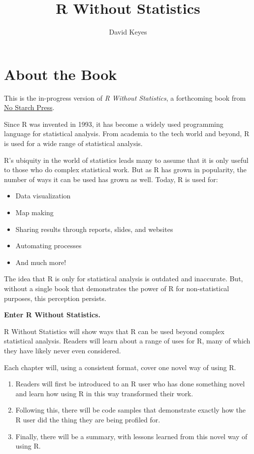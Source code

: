 \documentclass[
]{book}
\title{R Without Statistics}
\author{David Keyes}
\date{}
\begin{document}
\maketitle

{
\setcounter{tocdepth}{1}
\tableofcontents
}
\hypertarget{about-the-book}{%
\chapter{About the Book}\label{about-the-book}}

This is the in-progress version of \emph{R Without Statistics}, a forthcoming book from \href{https://www.nostarch.com/}{No Starch Press}.

Since R was invented in 1993, it has become a widely used programming language for statistical analysis. From academia to the tech world and beyond, R is used for a wide range of statistical analysis.

R's ubiquity in the world of statistics leads many to assume that it is only useful to those who do complex statistical work. But as R has grown in popularity, the number of ways it can be used has grown as well. Today, R is used for:

\begin{itemize}
\item
  Data visualization
\item
  Map making
\item
  Sharing results through reports, slides, and websites
\item
  Automating processes
\item
  And much more!
\end{itemize}

The idea that R is only for statistical analysis is outdated and inaccurate. But, without a single book that demonstrates the power of R for non-statistical purposes, this perception persists.

\textbf{Enter R Without Statistics.}

R Without Statistics will show ways that R can be used beyond complex statistical analysis. Readers will learn about a range of uses for R, many of which they have likely never even considered.

Each chapter will, using a consistent format, cover one novel way of using R.

\begin{enumerate}
\def\labelenumi{\arabic{enumi}.}
\item
  Readers will first be introduced to an R user who has done something novel and learn how using R in this way transformed their work.
\item
  Following this, there will be code samples that demonstrate exactly how the R user did the thing they are being profiled for.
\item
  Finally, there will be a summary, with lessons learned from this novel way of using R.
\end{enumerate}
\end{document}
